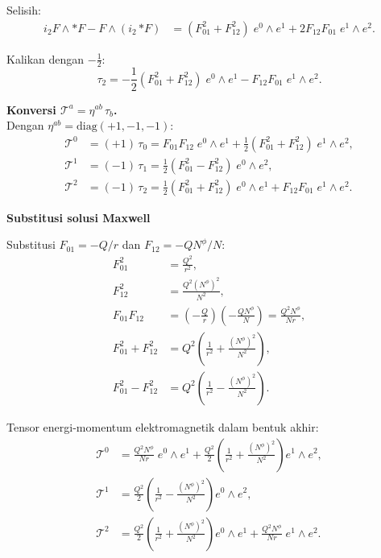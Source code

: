 Selisih:
\begin{align}
    i_2 F \wedge {*F} - F \wedge (i_2\,{*F}) &= (F_{01}^2 + F_{12}^2)\;e^0 \wedge e^1 + 2F_{12}F_{01}\;e^1 \wedge e^2.
\end{align}

Kalikan dengan $-\frac{1}{2}$:
\begin{equation}
    \tau_2 = -\frac{1}{2}(F_{01}^2 + F_{12}^2)\;e^0 \wedge e^1 - F_{12}F_{01}\;e^1 \wedge e^2. \label{mx45-eq:tau2}
\end{equation}

\noindent\textbf{Konversi $\mathcal{T}^a = \eta^{ab}\,\tau_b$.}\\[2pt]
Dengan $\eta^{ab} = \mathrm{diag}(+1,-1,-1)$:
\begin{align}
    \mathcal{T}^0 &= (+1)\,\tau_0 = F_{01}F_{12}\;e^0 \wedge e^1 + \frac{1}{2}(F_{01}^2 + F_{12}^2)\;e^1 \wedge e^2, \label{mx45-eq:T0-frame}\\[8pt]
    \mathcal{T}^1 &= (-1)\,\tau_1 = \frac{1}{2}(F_{01}^2 - F_{12}^2)\;e^0 \wedge e^2, \label{mx45-eq:T1-frame}\\[8pt]
    \mathcal{T}^2 &= (-1)\,\tau_2 = \frac{1}{2}(F_{01}^2 + F_{12}^2)\;e^0 \wedge e^1 + F_{12}F_{01}\;e^1 \wedge e^2. \label{mx45-eq:T2-frame}
\end{align}

\vspace{0.5em}
\noindent \textbf{Substitusi solusi Maxwell}

Substitusi $F_{01} = -Q/r$ dan $F_{12} = -QN^\phi/N$:
\begin{align}
    F_{01}^2 &= \frac{Q^2}{r^2}, \\[4pt]
    F_{12}^2 &= \frac{Q^2(N^\phi)^2}{N^2}, \\[4pt]
    F_{01}F_{12} &= \left(-\frac{Q}{r}\right)\!\left(-\frac{QN^\phi}{N}\right) = \frac{Q^2 N^\phi}{Nr}, \\[4pt]
    F_{01}^2 + F_{12}^2 &= Q^2\!\left(\frac{1}{r^2} + \frac{(N^\phi)^2}{N^2}\right), \\[4pt]
    F_{01}^2 - F_{12}^2 &= Q^2\!\left(\frac{1}{r^2} - \frac{(N^\phi)^2}{N^2}\right).
\end{align}

Tensor energi-momentum elektromagnetik dalam bentuk akhir:
\begin{align}
    \mathcal{T}^0 &= \frac{Q^2 N^\phi}{Nr}\;e^0 \wedge e^1
    + \frac{Q^2}{2}\!\left(\frac{1}{r^2} + \frac{(N^\phi)^2}{N^2}\right)e^1 \wedge e^2, \label{mx45-eq:T0-final}\\[8pt]
    \mathcal{T}^1 &= \frac{Q^2}{2}\!\left(\frac{1}{r^2} - \frac{(N^\phi)^2}{N^2}\right)e^0 \wedge e^2, \label{mx45-eq:T1-final}\\[8pt]
    \mathcal{T}^2 &= \frac{Q^2}{2}\!\left(\frac{1}{r^2} + \frac{(N^\phi)^2}{N^2}\right)e^0 \wedge e^1
    + \frac{Q^2 N^\phi}{Nr}\;e^1 \wedge e^2. \label{mx45-eq:T2-final}
\end{align}


